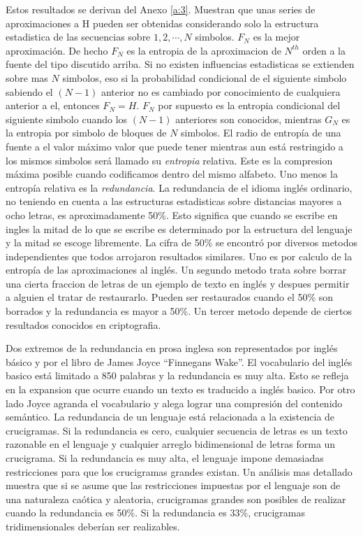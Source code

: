 Estos resultados se derivan del Anexo \ref{a:3}. Muestran que unas
series de aproximaciones a H pueden ser obtenidas considerando solo la
estructura estadistica de las secuencias sobre $1, 2, \cdots, N$
simbolos. $F_{N}$ es la mejor aproximaci\'{o}n. De hecho $F_{N}$ es la
entropia de la aproximacion de $N^{th}$ orden a la fuente del tipo
discutido arriba. Si no existen influencias estadisticas se extienden
sobre mas $N$ simbolos, eso si la probabilidad condicional de el
siguiente simbolo sabiendo el $(N-1)$ anterior no es cambiado por
conocimiento de cualquiera anterior a el, entonces $F_{N} =
H$. $F_{N}$ por supuesto es la entropia condicional del siguiente
simbolo cuando los $(N-1)$ anteriores son conocidos, mientras $G_{N}$
es la entropia por simbolo de bloques de $N$ simbolos.  El radio de
entrop\'{i}a de una fuente a el valor m\'{a}ximo valor que puede tener
mientras aun est\'{a} restringido a los mismos simbolos ser\'{a}
llamado su \textit{entropia} relativa. Este es la compresion
m\'{a}xima posible cuando codificamos dentro del mismo alfabeto. Uno
menos la entrop\'{i}a relativa es la \textit{redundancia}. La
redundancia de el idioma ingl\'{e}s ordinario, no teniendo en cuenta a
las estructuras estadisticas sobre distancias mayores a ocho letras,
es aproximadamente 50\%. Esto significa que cuando se escribe en
ingles la mitad de lo que se escribe es determinado por la estructura
del lenguaje y la mitad se escoge libremente. La cifra de 50\% se
encontr\'{o} por diversos metodos independientes que todos arrojaron
resultados similares. Uno es por calculo de la entrop\'{i}a de las
aproximaciones al ingl\'{e}s. Un segundo metodo trata sobre borrar una
cierta fraccion de letras de un ejemplo de texto en ingl\'{e}s y
despues permitir a alguien el tratar de restaurarlo. Pueden ser
restaurados cuando el 50\% son borrados y la redundancia es mayor a
50\%. Un tercer metodo depende de ciertos resultados conocidos en
criptografia.

Dos extremos de la redundancia en prosa inglesa son representados por
ingl\'{e}s b\'{a}sico y por el libro de James Joyce ``Finnegans
Wake''. El vocabulario del ingl\'{e}s basico est\'{a} limitado a 850
palabras y la redundancia es muy alta. Esto se refleja en la expansion
que ocurre cuando un texto es traducido a ingl\'{e}s basico. Por otro
lado Joyce agranda el vocabulario y alega lograr una compresi\'{o}n
del contenido sem\'{a}ntico.  La redundancia de un lenguaje est\'{a}
relacionada a la existencia de crucigramas. Si la redundancia es cero,
cualquier secuencia de letras es un texto razonable en el lenguaje y
cualquier arreglo bidimensional de letras forma un crucigrama. Si la
redundancia es muy alta, el lenguaje impone demasiadas restricciones
para que los crucigramas grandes existan. Un an\'{a}lisis mas
detallado muestra que si se asume que las restricciones impuestas por
el lenguaje son de una naturaleza ca\'{o}tica y aleatoria, crucigramas
grandes son posibles de realizar cuando la redundancia es 50\%. Si la
redundancia es 33\%, crucigramas tridimensionales deber\'{i}an ser
realizables.

\clearpage
